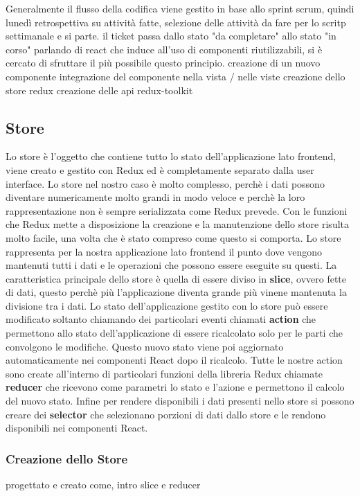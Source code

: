 Generalmente il flusso della codifica viene gestito in base allo sprint scrum, quindi lunedì retrospettiva su attività fatte, selezione delle attività da fare per lo scritp settimanale e si parte.
il ticket passa dallo stato "da completare" allo stato "in corso"
parlando di react che induce all'uso di componenti riutilizzabili, si è cercato di sfruttare il più possibile questo principio.
creazione di un nuovo componente
integrazione del componente nella vista / nelle viste
creazione dello store redux
creazione delle api redux-toolkit
\subsection{Store}
Lo store è l'oggetto che contiene tutto lo stato dell'applicazione lato frontend, viene creato e gestito con Redux ed è completamente separato dalla user interface.
Lo store nel nostro caso è molto complesso, perchè i dati possono diventare numericamente molto grandi in modo veloce e perchè la loro rappresentazione
non è sempre serializzata come Redux prevede. Con le funzioni che Redux mette a disposizione la creazione e la manutenzione dello store risulta molto facile, una volta che è stato compreso come questo si comporta.
Lo store rappresenta per la nostra applicazione lato frontend il punto dove vengono mantenuti tutti i dati e le operazioni che possono essere eseguite su questi. La caratteristica principale dello store è quella di essere diviso in
\textbf{slice}, ovvero fette di dati, questo perchè più l'applicazione diventa grande più vinene mantenuta la divisione tra i dati. Lo stato dell'applicazione gestito con lo store può essere modificato soltanto chiamando dei particolari eventi chiamati \textbf{action}
che permettono allo stato dell'applicazione di essere ricalcolato solo per le parti che convolgono le modifiche. Questo nuovo stato viene poi aggiornato automaticamente nei componenti React dopo il ricalcolo.
Tutte le nostre action sono create all'interno di particolari funzioni della libreria Redux chiamate \textbf{reducer} che ricevono come parametri lo stato e l'azione e permettono il calcolo del nuovo stato.
Infine per rendere disponibili i dati presenti nello store si possono creare dei \textbf{selector} che selezionano porzioni di dati dallo store e le rendono disponibili nei componenti React.
\subsubsection{Creazione dello Store}
progettato e creato come, intro slice e reducer

